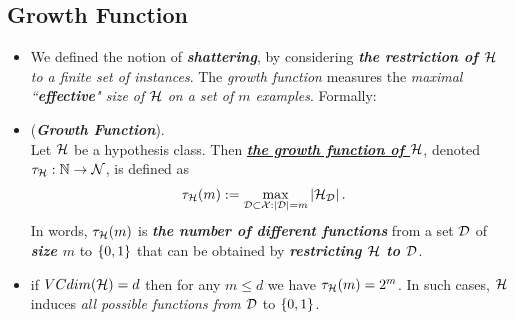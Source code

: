 \documentclass[11pt]{article}
\begin{document}
\subsection{Growth Function}
\begin{itemize}
\item \begin{remark}
We defined the notion of \emph{\textbf{shattering}}, by considering \emph{\textbf{the restriction of ${\mathcal H}$} to a finite set of instances}. The \emph{growth function} measures the \emph{maximal ``\textbf{effective}" size of ${\mathcal H}$ on a set of $m$ examples}. Formally:
\end{remark}

\item \begin{definition} (\emph{\textbf{Growth Function}}). \\
Let ${\mathcal H}$ be a hypothesis class. Then \underline{\emph{\textbf{the growth function of ${\mathcal H}$}}}, denoted $\tau_{{\mathcal H}}: {\mathbb N} \to {\mathcal N}$, is defined as
\begin{align*}
\tau_{{\mathcal H}}(m) &:= \max_{{\mathcal D} \subset {\mathcal X}: \left\lvert {\mathcal D} \right\rvert = m}\left\lvert {\mathcal H}_{{\mathcal D}} \right\rvert.
\end{align*}
In words, $\tau_{{\mathcal H}}(m)$ is \textbf{\emph{the number of different functions}} from a set ${\mathcal D}$ of \emph{\textbf{size $m$}} to $\left\{0,1\right\}$ that can be obtained by \emph{\textbf{restricting ${\mathcal H}$ to ${\mathcal D}$}}.
\end{definition}

\item \begin{remark}
if $VCdim({\mathcal H}) = d$ then for any $m \le d$ we have $\tau_{{\mathcal H}}(m) = 2^m$. In such cases, ${\mathcal H}$ induces \emph{all possible functions from} ${\mathcal D}$ to $\left\{0,1\right\}$. 
\end{remark}


\end{itemize}
\end{document}
